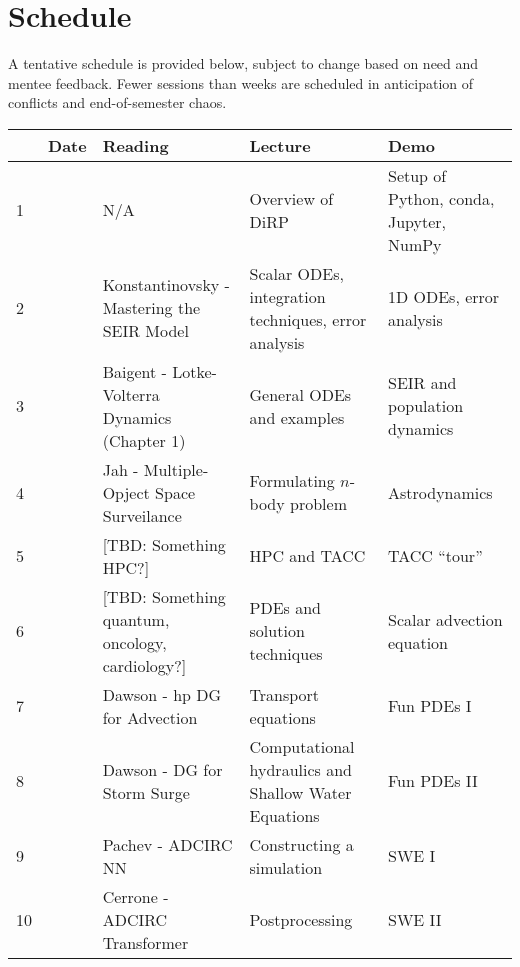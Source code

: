 \documentclass{article}
\begin{document}
	\section*{Schedule}
	A tentative schedule is provided below, subject to change based on need and mentee feedback. Fewer sessions than weeks are scheduled in anticipation of conflicts and end-of-semester chaos.
	
	\begin{tabular}{l|lp{4cm}p{4cm}p{4cm}}
		& Date & Reading & Lecture & Demo \\
		\hline
		1 &  & N/A & Overview of DiRP & Setup of Python, conda, Jupyter, NumPy \\
		\hline
		2 &  & Konstantinovsky - Mastering the SEIR Model & Scalar ODEs, integration techniques, error analysis & 1D ODEs, error analysis \\
		\hline
		3 &  & Baigent - Lotke-Volterra Dynamics (Chapter 1) & General ODEs and examples & SEIR and population dynamics \\
		\hline
		4 &  & Jah - Multiple-Opject Space Surveilance & Formulating $n$-body problem & Astrodynamics \\
		\hline
		5 &  & [TBD: Something HPC?] & HPC and TACC & TACC ``tour'' \\
		\hline
		6 &  & [TBD: Something quantum, oncology, cardiology?] & PDEs and solution techniques & Scalar advection equation \\
		\hline
		7 &  & Dawson - hp DG for Advection & Transport equations & Fun PDEs I \\
		\hline
		8 &  & Dawson - DG for Storm Surge & Computational hydraulics and Shallow Water Equations & Fun PDEs II \\
		\hline
		9 &  & Pachev - ADCIRC NN & Constructing a simulation & SWE I \\
		\hline
		10 &  & Cerrone - ADCIRC Transformer & Postprocessing & SWE II \\
	\end{tabular}
\end{document}
